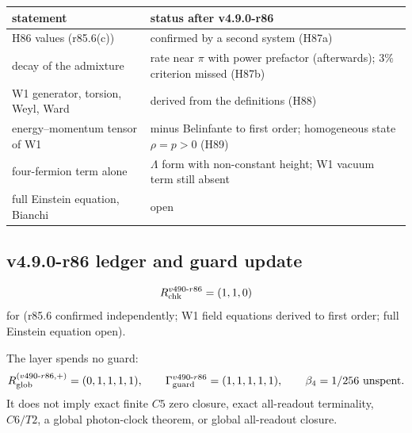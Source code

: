 \begin{center}
\small
\begin{tabular}{@{}>{\raggedright\arraybackslash}p{}>{\raggedright\arraybackslash}p{}@{}}
\toprule
statement & status after v4.9.0-r86\\
\midrule
H86 values (r85.6(c)) & confirmed by a second system (H87a)\\
decay of the admixture & rate near \(\pi\) with power prefactor (afterwards); \(3\%\) criterion missed (H87b)\\
W1 generator, torsion, Weyl, Ward & derived from the definitions (H88)\\
energy--momentum tensor of W1 & minus Belinfante to first order; homogeneous state \(\rho=p>0\) (H89)\\
four-fermion term alone & \(\Lambda\) form with non-constant height; W1 vacuum term still absent\\
full Einstein equation, Bianchi & open\\
\bottomrule
\end{tabular}
\end{center}

\subsection*{v4.9.0-r86 ledger and guard update}
\label{subsec:v490-r86-ledger-guard}

\[
R_{\rm chk}^{v490\text{-}r86}=(1,1,0)
\]
for (r85.6 confirmed independently; W1 field equations derived to first order; full Einstein equation open).

The layer spends no guard:
\[
R_{\rm glob}^{(v490\text{-}r86,+)}=(0,1,1,1,1),
\qquad
\Gamma_{\rm guard}^{v490\text{-}r86}=(1,1,1,1,1),
\qquad
\beta_4=1/256\ \text{unspent}.
\]
It does not imply exact finite \(C5\) zero closure, exact all-readout terminality,
\(C6/T2\), a global photon-clock theorem, or global all-readout closure.
